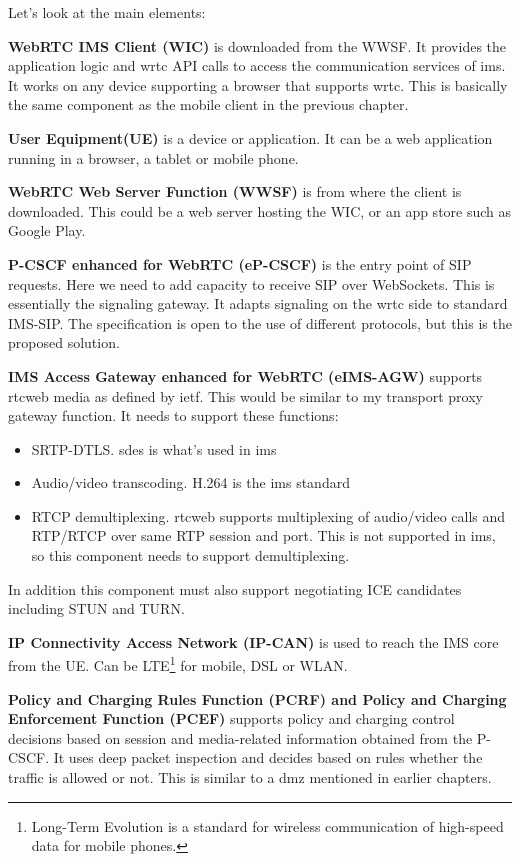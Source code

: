 Let's look at the main elements:

\textbf{WebRTC IMS Client (WIC)}
is downloaded from the WWSF. It provides the application logic and \gls{wrtc} API calls to access the communication services of \gls{ims}. It works on any device supporting a browser that supports \gls{wrtc}. This is basically the same component as the mobile client in the previous chapter.

\textbf{User Equipment(UE)}
is a device or application. It can be a web application running in a browser, a tablet or mobile phone.

\textbf{WebRTC Web Server Function (WWSF)}
is from where the client is downloaded. This could be a web server hosting the WIC, or an app store such as Google Play.

\textbf{P-CSCF enhanced for WebRTC (eP-CSCF)}
is the entry point of SIP requests. Here we need to add capacity to receive SIP over WebSockets. This is essentially the signaling gateway. It adapts signaling on the \gls{wrtc} side to standard IMS-SIP. The specification is open to the use of different protocols, but this is the proposed solution.

\textbf{IMS Access Gateway enhanced for WebRTC (eIMS-AGW)}
supports \gls{rtcweb} media as defined by \gls{ietf}. This would be similar to my transport proxy gateway function. It needs to support these functions:
\begin{itemize}
\item{SRTP-DTLS. \gls{sdes} is what's used in \gls{ims}}
\item{Audio/video transcoding. H.264 is the \gls{ims} standard}
\item{RTCP demultiplexing. \gls{rtcweb} supports multiplexing of audio/video calls and RTP/RTCP over same RTP session and port. This is not supported in \gls{ims}, so this component needs to support demultiplexing.}
\end{itemize}

In addition this component must also support negotiating ICE candidates including STUN and TURN.

\textbf{IP Connectivity Access Network (IP-CAN)}
is used to reach the IMS core from the UE. Can be LTE\footnote{Long-Term Evolution is a standard for wireless communication of high-speed data for mobile phones.} for mobile, DSL or WLAN.

\textbf{Policy and Charging Rules Function (PCRF) and Policy and Charging Enforcement Function (PCEF)}
supports policy and charging control decisions based on session and media-related information obtained from the P-CSCF. It uses deep packet inspection and decides based on rules whether the traffic is allowed or not. This is similar to a \gls{dmz} mentioned in earlier chapters.

